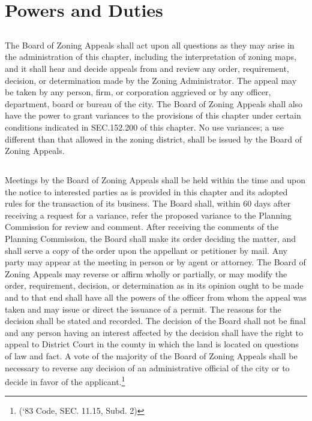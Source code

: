 \section{Powers and Duties}
\subsection{}
The Board of Zoning Appeals shall act upon all questions as they may arise in the administration of this chapter, including the interpretation of zoning maps, and it shall hear and decide appeals from and review any order, requirement, decision, or determination made by the Zoning Administrator. The appeal may be taken by any person, firm, or corporation aggrieved or by any officer, department, board or bureau of the city. The Board of Zoning Appeals shall also have the power to grant variances to the provisions of this chapter under certain conditions indicated in SEC.152.200 of this chapter. No use variances; a use different than that allowed in the zoning district, shall be issued by the Board of Zoning Appeals.
\subsection{}
Meetings by the Board of Zoning Appeals shall be held within the time and upon the notice to interested parties as is provided in this chapter and its adopted rules for the transaction of its business. The Board shall, within 60 days after receiving a request for a variance, refer the proposed variance to the Planning Commission for review and comment. After receiving the comments of the Planning Commission, the Board shall make its order deciding the matter, and shall serve a copy of the order upon the appellant or petitioner by mail. Any party may appear at the meeting in person or by agent or attorney. The Board of Zoning Appeals may reverse or affirm wholly or partially, or may modify the order, requirement, decision, or determination as in its opinion ought to be made and to that end shall have all the powers of the officer from whom the appeal was taken and may issue or direct the issuance of a permit. The reasons for the decision shall be stated and recorded.  The decision of the Board shall not be final and any person having an interest affected by the decision shall have the right to appeal to District Court in the county in which the land is located on questions of law and fact. A vote of the majority of the Board of Zoning Appeals shall be necessary to reverse any decision of an administrative official of the city or to decide in favor of the applicant.\footnote{(‘83 Code, SEC. 11.15, Subd. 2)}\\

